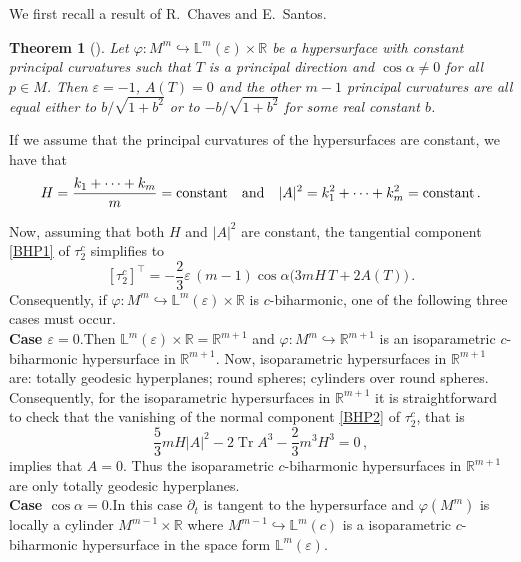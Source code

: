 \documentclass[11pt,leqno]{amsart}
\theoremstyle{plain}
\newtheorem{theorem}                {Theorem}      [section]
\theoremstyle{definition}
\numberwithin{equation}{section}
\def \R{{\mathbb R}}
\DeclareMathOperator{\trace}{Tr}
\numberwithin{equation}{section}
\begin{document}
{We first recall a result of R.~Chaves and E.~Santos.

\begin{theorem}[{\cite[Theorem~4.1]{MR4032814}}]\label{teo:chaves-santos}
Let $\varphi:M^{m}\hookrightarrow {\mathbb L}^m(\varepsilon)\times \mathbb{R}$  be a hypersurface with constant principal curvatures such that $T$ is a principal direction and $\cos\alpha\neq 0$ for all $p\in M$. Then $\varepsilon=-1$, $A(T)=0$ and the other $m-1$ principal curvatures are all equal either to $b/\sqrt{1+b^2}$ or to $-b/\sqrt{1+b^2}$ for some real constant $b$.
\end{theorem}

If we assume that the principal curvatures of the hypersurfaces are constant, we have that
\[
H=\frac{k_1+\cdots+k_m}{m}={\rm constant}\quad {\rm and}\quad |A|^2=k_1^2+\cdots+k_m^2={\rm constant}\,.
\]

Now, assuming that both $H$ and $|A|^2$ are constant, the tangential component \eqref{BHP1}  of $\tau_2^c$ simplifies to
\begin{equation}\label{BHP2-1}
\left[\tau_2^c\right]^{\top} =  -\frac{2}{3} \varepsilon\, (m-1)  \cos \alpha \big(3m H\, T  +2 A(T)\big)\,.
\end{equation}
Consequently, if $\varphi:M^{m}\hookrightarrow {\mathbb L}^m(\varepsilon)\times \mathbb{R}$ is $c$-biharmonic, one of the following three cases must occur.\\

\textbf{Case $\varepsilon=0$}.\quad Then ${\mathbb L}^m(\varepsilon)\times \mathbb{R}= \mathbb{R}^{m+1}$ and $\varphi:M^{m}\hookrightarrow \mathbb{R}^{m+1}$ is an isoparametric $c$-biharmonic hypersurface in $\mathbb{R}^{m+1}$. Now, isoparametric hypersurfaces in $\mathbb{R}^{m+1}$ are: totally geodesic hyperplanes; round spheres; cylinders over round spheres. Consequently, for the isoparametric hypersurfaces in $\mathbb{R}^{m+1}$ it is straightforward to check that the vanishing of the normal component \eqref{BHP2} of $\tau_2^c$, that is 
\begin{equation}\label{BHP2-2}
 \frac{5}{3} m H |A|^2 -2 \trace A^3-\frac{2}{3} m^3 H^3=0\,,
\end{equation}
implies that $A=0$. Thus the isoparametric $c$-biharmonic hypersurfaces in $\mathbb{R}^{m+1}$ are only totally geodesic hyperplanes.\\

\textbf{Case $\cos\alpha=0$}.\quad In this case $\partial_t$ is tangent to the hypersurface and $\varphi(M^m)$ is locally a cylinder $M^{m-1}\times\R$ where $M^{m-1}\hookrightarrow {\mathbb L}^m(c)$ is a isoparametric $c$-biharmonic hypersurface in the space form ${\mathbb L}^m(\varepsilon)$. \\

}
\end{document}
